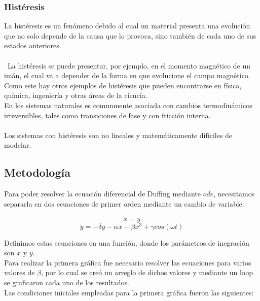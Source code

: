 \documentclass[letterpaper,12pt]{article}
\begin{document}
\subsubsection{Histéresis}
La histéresis es un fenómeno debido al cual un material presenta una evolución que no solo depende de la causa que lo provoca, sino también de cada uno de sus estados anteriores.\\\\\
La histéresis se puede presentar, por ejemplo, en el momento magnético de un imán, el cual va a depender de la forma en que evolucione el campo magnético.\\
Como este hay otros ejemplos de histéresis que pueden encontrarse en física, química, ingeniería y otras áreas de la ciencia.\\ 
En los sistemas naturales es comunmente asociada con cambios termodinámicos irreversibles, tales como transiciones de fase y con fricción interna.
\\\\
Los sistemas con histéresis son no lineales y matemáticamente difíciles de modelar.



\subsection{Metodología}
Para poder resolver la ecuación diferencial de Duffing mediante $ode$, necesitamos separarla en dos ecuaciones de primer orden mediante un cambio de variable:

\[\Dot{x} = y\]
\[\Dot{y}= - \delta y - \alpha x - \beta x^{3} + \gamma cos( \omega t)\]

Definimos estas ecuaciones en una función, donde los parámetros de inegración son $x$ y $y$.\\

Para realizar la primera gráfica fue necesario resolver las ecuaciones para varios valores de $\beta$, por lo cual se creó un arreglo de dichos valores y mediante un loop se graficaron cada uno de los resultados.\\

Las condiciones iniciales empleadas para la primera gráfica fueron las siguientes:  
\end{document}
